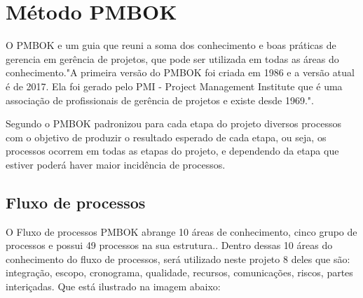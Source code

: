 \section{Método PMBOK }
O PMBOK e um guia que reuni a soma dos conhecimento e boas práticas de gerencia em gerência de projetos, que pode ser utilizada em todas as áreas do conhecimento."A primeira versão do PMBOK foi criada em 1986 e a versão atual é de 2017. Ela foi gerado pelo PMI - Project Management Institute que é uma associação de profissionais de gerência de projetos e existe desde 1969."\cite{machado2001gerencia}.

Segundo \cite{maciel2006metodo} o PMBOK padronizou para cada etapa do projeto diversos processos com o objetivo de produzir o resultado esperado de cada etapa, ou seja, os processos ocorrem em todas as etapas do projeto, e dependendo da etapa que estiver poderá haver maior incidência de processos. 

\subsection{Fluxo de processos}
 O Fluxo de processos PMBOK abrange 10 áreas de conhecimento, cinco grupo de processos e possui 49 processos na sua estrutura.\cite{borja2019aplicaccao}. Dentro dessas 10 áreas do conhecimento do fluxo de processos, será utilizado neste projeto 8 deles que são: integração, escopo, cronograma, qualidade, recursos, comunicações, riscos, partes interiçadas. Que está ilustrado na imagem abaixo:
 


